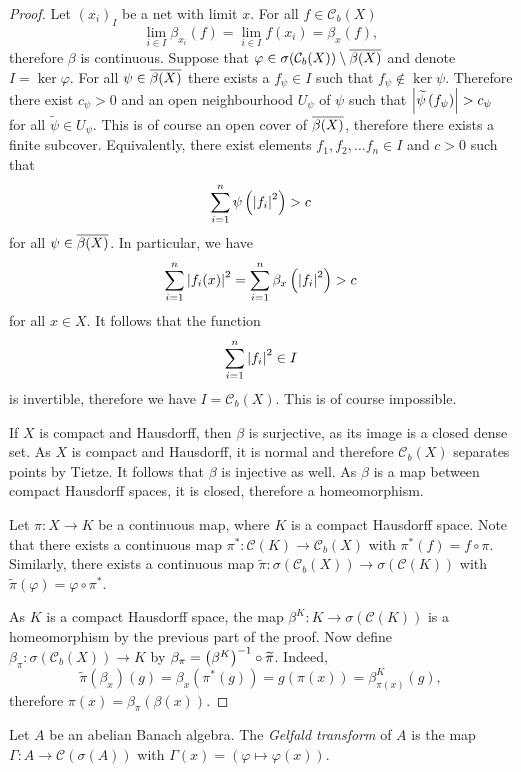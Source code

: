 \begin{proof}
Let $(x_i)_I$ be a net with limit $x$. For all
$f \in \mathcal{C}_b(X)$
\[
\lim_{i \in I} \beta_{x_i}(f) =
\lim_{i \in I} f(x_i) =
\beta_x(f),
\]
therefore $\beta$ is continuous. Suppose that
$\varphi \in \sigma(\mathcal{C}_b(X)) \setminus \overline{\beta(X)}$
and denote $I = \ker \varphi$. For all $\psi \in \overline{\beta(X)}$
there exists a $f_\psi \in I$ such that
$f_\psi \not \in \ker \psi$. Therefore there exist $c_\psi > 0$ and
an open neighbourhood $U_\psi$ of $\psi$ such that
$\left\lvert \widetilde{\psi} \left(f_\psi\right)\right\rvert > c_\psi$ for all
$\widetilde{\psi} \in U_\psi$. This is of course an open cover of
$\overline{\beta(X)}$, therefore there exists a finite subcover.
Equivalently, there exist elements $f_1, f_2, \dots f_n \in I$ and
$c > 0$ such that
\[
\sum_{i=1}^n \psi \left(\left\lvert f_i\right\rvert^2\right) > c
\]
for all $\psi \in \overline{\beta(X)}$. In particular, we have
\[
\sum_{i=1}^n \left\lvert f_i(x)\right\rvert^2 =
\sum_{i=1}^n \beta_x \left(\left\lvert f_i\right\rvert^2\right) >
c
\]
for all $x \in X$. It follows that the function
\[
\sum_{i=1}^n \left\lvert f_i\right\rvert^2 \in I
\]
is invertible, therefore we have $I = \mathcal{C}_b(X)$. This is
of course impossible.

If $X$ is compact and Hausdorff, then $\beta$ is surjective, as its
image is a closed dense set. As $X$ is compact and Hausdorff, it is
normal and therefore $\mathcal{C}_b(X)$ separates points by Tietze.
It follows that $\beta$ is injective as well. As $\beta$ is a map
between compact Hausdorff spaces, it is closed, therefore a
homeomorphism.

Let $\pi \colon X \to K$ be a continuous map, where $K$ is a
compact Hausdorff space. Note that there exists a continuous map
$\pi^* \colon \mathcal{C}(K) \to \mathcal{C}_b(X)$ with
$\pi^*(f) = f \circ \pi$. Similarly, there exists a continuous map
$\widetilde{\pi} \colon
\sigma(\mathcal{C}_b(X)) \to \sigma(\mathcal{C}(K))$ with
$\widetilde{\pi}(\varphi) = \varphi \circ \pi^*$.

As $K$ is a compact Hausdorff space, the map
$\beta^K \colon K \to \sigma(\mathcal{C}(K))$ is a homeomorphism by
the previous part of the proof. Now define
$\beta_\pi \colon \sigma(\mathcal{C}_b(X)) \to K$ by
$\beta_\pi = \left(\beta^K\right)^{-1} \circ \widetilde{\pi}$. Indeed,
\[
\widetilde{\pi}(\beta_x)(g) =
\beta_x(\pi^*(g)) =
g(\pi(x)) =
\beta_{\pi(x)}^K(g),
\]
therefore $\pi(x) = \beta_\pi(\beta(x))$.
\end{proof}

\begin{definicija}
Let $A$ be an abelian Banach algebra. The
\emph{Gelfald transform} of $A$ is the map
$\Gamma \colon A \to \mathcal{C}(\sigma(A))$ with
$\Gamma(x) = (\varphi \mapsto \varphi(x))$.
\end{definicija}

